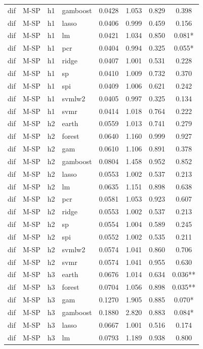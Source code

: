 \begin{ThreePartTable}
\begin{longtable}[t]{llclcccc}
dif & M-SP & h1 & gamboost & 0.0428 & 1.053 & 0.829 & 0.398\\
dif & M-SP & h1 & lasso & 0.0406 & 0.999 & 0.459 & 0.156\\
dif & M-SP & h1 & lm & 0.0421 & 1.034 & 0.850 & 0.081*\\
dif & M-SP & h1 & pcr & 0.0404 & 0.994 & 0.325 & 0.055*\\
dif & M-SP & h1 & ridge & 0.0407 & 1.001 & 0.531 & 0.228\\
dif & M-SP & h1 & sp & 0.0410 & 1.009 & 0.732 & 0.370\\
dif & M-SP & h1 & spi & 0.0409 & 1.006 & 0.621 & 0.242\\
dif & M-SP & h1 & svmlw2 & 0.0405 & 0.997 & 0.325 & 0.134\\
dif & M-SP & h1 & svmr & 0.0414 & 1.018 & 0.764 & 0.222\\
\addlinespace
dif & M-SP & h2 & earth & 0.0559 & 1.013 & 0.741 & 0.279\\
dif & M-SP & h2 & forest & 0.0640 & 1.160 & 0.999 & 0.927\\
dif & M-SP & h2 & gam & 0.0610 & 1.106 & 0.891 & 0.378\\
dif & M-SP & h2 & gamboost & 0.0804 & 1.458 & 0.952 & 0.852\\
dif & M-SP & h2 & lasso & 0.0553 & 1.002 & 0.537 & 0.213\\
dif & M-SP & h2 & lm & 0.0635 & 1.151 & 0.898 & 0.638\\
dif & M-SP & h2 & pcr & 0.0581 & 1.053 & 0.923 & 0.607\\
dif & M-SP & h2 & ridge & 0.0553 & 1.002 & 0.537 & 0.213\\
dif & M-SP & h2 & sp & 0.0554 & 1.004 & 0.589 & 0.245\\
dif & M-SP & h2 & spi & 0.0552 & 1.002 & 0.535 & 0.211\\
dif & M-SP & h2 & svmlw2 & 0.0574 & 1.041 & 0.860 & 0.706\\
dif & M-SP & h2 & svmr & 0.0574 & 1.041 & 0.955 & 0.630\\
\addlinespace
dif & M-SP & h3 & earth & 0.0676 & 1.014 & 0.634 & 0.036**\\
dif & M-SP & h3 & forest & 0.0704 & 1.056 & 0.898 & 0.035**\\
dif & M-SP & h3 & gam & 0.1270 & 1.905 & 0.885 & 0.070*\\
dif & M-SP & h3 & gamboost & 0.1880 & 2.820 & 0.883 & 0.084*\\
dif & M-SP & h3 & lasso & 0.0667 & 1.001 & 0.516 & 0.174\\
dif & M-SP & h3 & lm & 0.0793 & 1.189 & 0.938 & 0.800\\

\end{longtable}
\end{ThreePartTable}
